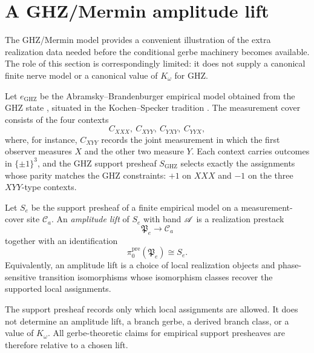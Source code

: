 \section{A GHZ/Mermin amplitude lift}\label{sec:appendix-ghz}

The GHZ/Mermin model provides a convenient illustration of the extra realization data needed before the conditional gerbe machinery becomes available. The role of this section is correspondingly limited: it does not supply a canonical finite nerve model or a canonical value of $K_\omega$ for GHZ.

Let $e_{\mathrm{GHZ}}$ be the Abramsky--Brandenburger empirical model obtained from the GHZ state \cite{GreenbergerHorneZeilinger1989,Mermin1990,AbramskyBrandenburger2011}, situated in the Kochen--Specker tradition \cite{KochenSpecker1967}. The measurement cover consists of the four contexts
\[
C_{XXX},\ C_{XYY},\ C_{YXY},\ C_{YYX},
\]
where, for instance, $C_{XYY}$ records the joint measurement in which the first observer measures $X$ and the other two measure $Y$. Each context carries outcomes in $\{\pm 1\}^3$, and the GHZ support presheaf $S_{\mathrm{GHZ}}$ selects exactly the assignments whose parity matches the GHZ constraints: $+1$ on $XXX$ and $-1$ on the three $XYY$-type contexts.

\begin{definition}\label{def:amplitude-lift}
Let $S_e$ be the support presheaf of a finite empirical model on a measurement-cover site $\mathcal C_a$. An \emph{amplitude lift} of $S_e$ with band $\mathscr{A}$ is a realization prestack
\[
\mathfrak P_e\to \mathcal C_a
\]
together with an identification
\[
\pi_0^{\mathrm{pre}}(\mathfrak P_e)\cong S_e.
\]
Equivalently, an amplitude lift is a choice of local realization objects and phase-sensitive transition isomorphisms whose isomorphism classes recover the supported local assignments.
\end{definition}

\begin{remark}\label{rem:amplitude-lift-choice}
The support presheaf records only which local assignments are allowed. It does not determine an amplitude lift, a branch gerbe, a derived branch class, or a value of $K_\omega$. All gerbe-theoretic claims for empirical support presheaves are therefore relative to a chosen lift.
\end{remark}


